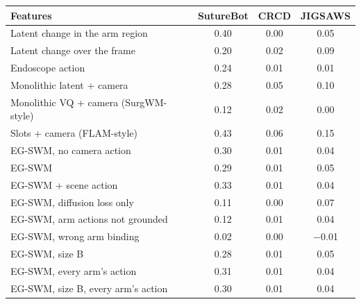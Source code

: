 \begin{tabular}{lccc}
\toprule
Features & SutureBot & CRCD & JIGSAWS \\
\midrule
Latent change in the arm region & 0.40 & 0.00 & 0.05 \\
Latent change over the frame & 0.20 & 0.02 & 0.09 \\
Endoscope action & 0.24 & 0.01 & 0.01 \\
\midrule
Monolithic latent + camera & 0.28 & 0.05 & 0.10 \\
Monolithic VQ + camera (SurgWM-style) & 0.12 & 0.02 & 0.00 \\
Slots + camera (FLAM-style) & 0.43 & 0.06 & 0.15 \\
EG-SWM, no camera action & 0.30 & 0.01 & 0.04 \\
EG-SWM & 0.29 & 0.01 & 0.05 \\
EG-SWM + scene action & 0.33 & 0.01 & 0.04 \\
EG-SWM, diffusion loss only & 0.11 & 0.00 & 0.07 \\
EG-SWM, arm actions not grounded & 0.12 & 0.01 & 0.04 \\
EG-SWM, wrong arm binding & 0.02 & 0.00 & $-$0.01 \\
EG-SWM, size B & 0.28 & 0.01 & 0.05 \\
EG-SWM, every arm's action & 0.31 & 0.01 & 0.04 \\
EG-SWM, size B, every arm's action & 0.30 & 0.01 & 0.04 \\
\bottomrule
\end{tabular}
